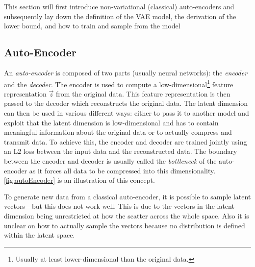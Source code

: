 		This section will first introduce non-variational (classical) auto-encoders and subsequently lay down the definition of the VAE model, the derivation of the lower bound, and how to train and sample from the model

		\subsection{Auto-Encoder}
			An \emph{auto-encoder} is composed of two parts (usually neural networks): the \emph{encoder} and the \emph{decoder}. The encoder is used to compute a low-dimensional\footnote{Usually at least lower-dimensional than the original data.} feature representation \(\vec{z}\) from the original data. This feature representation is then passed to the decoder which reconstructs the original data. The latent dimension can then be used in various different ways: either to pass it to another model and exploit that the latent dimension is low-dimensional and has to contain meaningful information about the original data or to actually compress and transmit data. To achieve this, the encoder and decoder are trained jointly using an L2 loss between the input data and the reconstructed data. The boundary between the encoder and decoder is usually called the \emph{bottleneck} of the auto-encoder as it forces all data to be compressed into this dimensionality. \autoref{fig:autoEncoder} is an illustration of this concept.

			To generate new data from a classical auto-encoder, it is possible to sample latent vectors---but this does not work well. This is due to the vectors in the latent dimension being unrestricted at how the scatter across the whole space. Also it is unclear on how to actually sample the vectors because no distribution is defined within the latent space.

